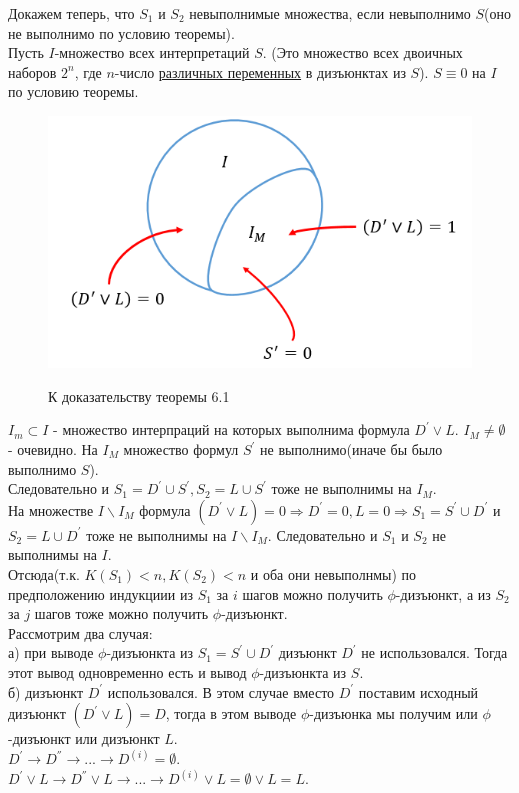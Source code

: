 \documentclass{article}
\numberwithin{example}{section}
\numberwithin{question}{section}
\numberwithin{Remark}{section}
\numberwithin{theorem}{section}
\numberwithin{definition}{section}
\numberwithin{proposition}{section}
\begin{document}
Докажем теперь, что $S_1$ и  $S_2$ невыполнимые множества, если невыполнимо $S$(оно не выполнимо по условию теоремы).\\
Пусть $I$-множество всех интерпретаций $S$. (Это множество всех двоичных наборов $2^n$, где $n$-число \underline{различных переменных} в дизъюнктах из $S$). $S\equiv 0$ на $I$ по условию теоремы.\\
\begin{figure}[!htbp]
	\centering
	\includegraphics[width=0.5\linewidth]{6-1}
	\label{fig:6-1}
	\caption{К доказательству теоремы 6.1}
\end{figure}
$I_m\subset I$ - множество интерпраций на которых выполнима формула $D^{'} \lor L$. $I_M\ne \emptyset$ - очевидно. На $I_M$ множество формул $S^{'}$ не выполнимо(иначе бы было выполнимо $S$).\\
Следовательно и $S_1 = D^{'} \cup S^{'},S_2=L\cup S^{'}$ тоже не выполнимы на $I_M$.\\
На множестве $I\backslash I_M$ формула $(D^{'} \lor L)=0 \Rightarrow D^{'} =0, L=0 \Rightarrow S_1 = S^{'} \cup D^{'}$ и $S_2 =L\cup D^{'}$ тоже не выполнимы на $I\backslash I_M$. Следовательно и $S_1$ и $S_2$ не выполнимы на $I$.\\
Отсюда(т.к. $K(S_1)<n, K(S_2)<n$ и оба они невыполнмы) по предположению индукциии из $S_1$ за $i$ шагов можно получить $\phi$-дизъюнкт, а из $S_2$ за $j$ шагов тоже можно получить $\phi$-дизъюнкт.\\
Рассмотрим два случая:\\
а) при выводе $\phi$-дизъюнкта из $S_1 = S^{'}\cup D^{'}$ дизъюнкт $D^{'}$ не использовался. Тогда этот вывод одновременно есть и вывод $\phi$-дизъюнкта из $S$.\\
б) дизъюнкт $D^{'}$ использовался. В этом случае вместо $D^{'}$ поставим исходный дизъюнкт $(D^{'}\lor L)=D$, тогда в этом выводе $\phi$-дизъюнка мы получим или $\phi$-дизъюнкт или дизъюнкт $L$.\\
$D^{'} \longrightarrow D^{''} \longrightarrow ... \longrightarrow D^{(i)}=\emptyset$.\\
$D^{'}\lor L \longrightarrow D^{''}\lor L\longrightarrow ... \longrightarrow D^{(i)}\lor L = \emptyset \lor L = L$.\\
\end{document}
